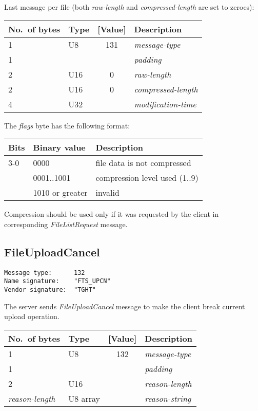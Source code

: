 \documentclass[a4paper]{article}
\newcommand{\typestr}[1]{\textit{#1}}
\begin{document}
Last message per file (both \typestr{raw-length} and
\typestr{compressed-length} are set to zeroes):

\begin{tabular}{l|lc|l} \hline
No.\ of bytes & Type & [Value] & Description \\ \hline
1 & U8  & 131 & \typestr{message-type} \\
1 &     &     & \typestr{padding} \\
2 & U16 &   0 & \typestr{raw-length} \\
2 & U16 &   0 & \typestr{compressed-length} \\
4 & U32 &     & \typestr{modification-time} \\
\hline\end{tabular}

The \typestr{flags} byte has the following format:

\begin{tabular}{l|l|l}
\hline
Bits & Binary value   & Description \\ \hline
3-0 & 0000            & file data is not compressed \\
    & 0001..1001      & compression level used (1..9) \\
    & 1010 or greater & invalid \\
\hline
\end{tabular}

Compression should be used only if it was requested by the client in
corresponding \typestr{FileListRequest} message.


\newpage
\subsection{FileUploadCancel}
\begin{verbatim}
Message type:      132
Name signature:    "FTS_UPCN"
Vendor signature:  "TGHT"
\end{verbatim}

The server sends \typestr{FileUploadCancel} message to make the client
break current upload operation.

\begin{tabular}{l|lc|l} \hline
No.\ of bytes & Type & [Value] & Description \\ \hline
1 & U8  & 132 & \typestr{message-type} \\
1 &     &     & \typestr{padding} \\
2 & U16 &     & \typestr{reason-length} \\
\typestr{reason-length} & U8 array & & \typestr{reason-string} \\
\hline\end{tabular}
\end{document}

